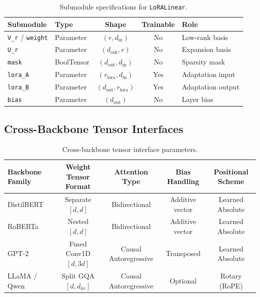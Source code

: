 \begin{table}[H]
\centering
\small
\begin{tabular}{llccp{5cm}}
\toprule
\textbf{Submodule} & \textbf{Type} & \textbf{Shape} & \textbf{Trainable} & \textbf{Role} \\
\midrule
\texttt{V\_r} / \texttt{weight} & Parameter & $(r, d_{\text{in}})$ & No & Low-rank basis \\
\texttt{U\_r} & Parameter & $(d_{\text{out}}, r)$ & No & Expansion basis \\
\texttt{mask} & BoolTensor & $(d_{\text{out}}, d_{\text{in}})$ & No & Sparsity mask \\
\texttt{lora\_A} & Parameter & $(r_{\text{lora}}, d_{\text{in}})$ & Yes & Adaptation input \\
\texttt{lora\_B} & Parameter & $(d_{\text{out}}, r_{\text{lora}})$ & Yes & Adaptation output \\
\texttt{bias} & Parameter & $(d_{\text{out}})$ & No & Layer bias \\
\bottomrule
\end{tabular}
\caption{Submodule specifications for \texttt{LoRALinear}.}
\label{tab:submodules_squeezingheads}
\end{table}

\subsection{Cross-Backbone Tensor Interfaces}
\begin{table}[H]
\centering
\small
\begin{tabular}{lcccc}
\toprule
\textbf{Backbone Family} & \textbf{Weight Tensor Format} & \textbf{Attention Type} & \textbf{Bias Handling} & \textbf{Positional Scheme} \\
\midrule
DistilBERT & Separate $[d, d]$ & Bidirectional & Additive vector & Learned Absolute \\
RoBERTa & Nested $[d, d]$ & Bidirectional & Additive vector & Learned Absolute \\
GPT-2 & Fused Conv1D $[d, 3d]$ & Causal Autoregressive & Transposed & Learned Absolute \\
LLaMA / Qwen & Split GQA $[d, d_{kv}]$ & Causal Autoregressive & Optional & Rotary (RoPE) \\
\bottomrule
\end{tabular}
\caption{Cross-backbone tensor interface parameters.}
\label{tab:backbone_interfaces}
\end{table}

